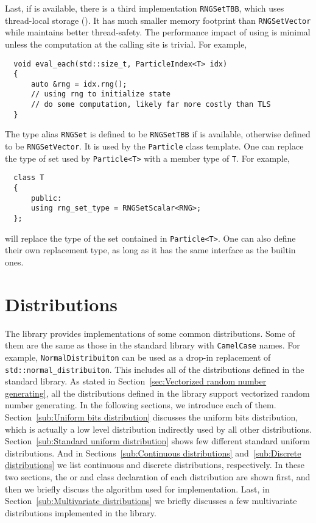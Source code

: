 Last, if \tbb is available, there is a third implementation \verb|RNGSetTBB|,
which uses thread-local storage (\tls). It has much smaller memory footprint
than \verb|RNGSetVector| while maintains better thread-safety. The performance
impact of using \tls is minimal unless the computation at the calling site is
trivial. For example,
\begin{Verbatim}
  void eval_each(std::size_t, ParticleIndex<T> idx)
  {
      auto &rng = idx.rng();
      // using rng to initialize state
      // do some computation, likely far more costly than TLS
  }
\end{Verbatim}
The type alias \verb|RNGSet| is defined to be \verb|RNGSetTBB| if \tbb is
available, otherwise defined to be \verb|RNGSetVector|. It is used by the
\verb|Particle| class template. One can replace the type of \rng set used by
\verb|Particle<T>| with a member type of \verb|T|. For example,
\begin{Verbatim}
  class T
  {
      public:
      using rng_set_type = RNGSetScalar<RNG>;
  };
\end{Verbatim}
will replace the type of the \rng set contained in \verb|Particle<T>|. One can
also define their own replacement type, as long as it has the same interface as
the builtin ones.

\section{Distributions}
\label{sec:Distributions}

The library provides implementations of some common distributions. Some of them
are the same as those in the standard library with \verb|CamelCase| names. For
example, \verb|NormalDistribuiton| can be used as a drop-in replacement of
\verb|std::normal_distribuiton|. This includes all of the distributions defined
in the standard library. As stated in Section~\ref{sec:Vectorized random number
  generating}, all the distributions defined in the library support vectorized
random number generating. In the following sections, we introduce each of them.
Section~\ref{sub:Uniform bits distribution} discusses the uniform bits
distribution, which is actually a low level distribution indirectly used by all
other distributions. Section~\ref{sub:Standard uniform distribution} shows few
different standard uniform distributions. And in Sections~\ref{sub:Continuous
  distributions} and~\ref{sub:Discrete distributions} we list continuous and
discrete distributions, respectively. In these two sections, the \pdf or \pmf
and class declaration of each distribution are shown first, and then we briefly
discuss the algorithm used for implementation. Last, in
Section~\ref{sub:Multivariate distributions} we briefly discusses a few
multivariate distributions implemented in the library.

